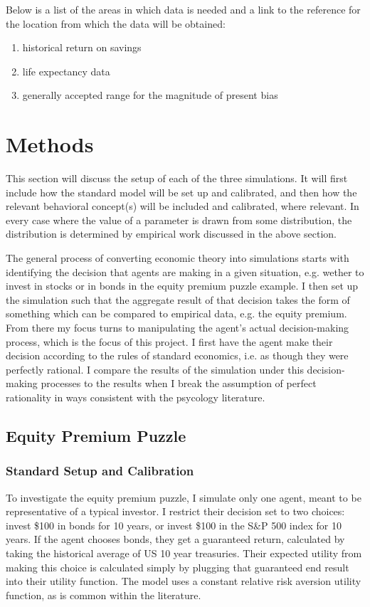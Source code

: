 \documentclass[10pt,twocolumn]{article}
\begin{document}
Below is a list of the areas in which data is needed and a link to the reference for the location from which the data will be obtained:
\begin{enumerate}
    \item historical return on savings\cite{returns}
    \item life expectancy data\cite{death}
    \item generally accepted range for the magnitude of present bias\cite{presentbias}
\end{enumerate}

\section{Methods}
This section will discuss the setup of each of the three simulations. It will first include how the standard model will be set up and calibrated, and then how the relevant behavioral concept(s) will be included and calibrated, where relevant. In every case where the value of a parameter is drawn from some distribution, the distribution is determined by empirical work discussed in the above section.

The general process of converting economic theory into simulations starts with identifying the decision that agents are making in a given situation, e.g. wether to invest in stocks or in bonds in the equity premium puzzle example. I then set up the simulation such that the aggregate result of that decision takes the form of something which can be compared to empirical data, e.g. the equity premium. From there my focus turns to manipulating the agent's actual decision-making process, which is the focus of this project. I first have the agent make their decision according to the rules of standard economics, i.e. as though they were perfectly rational. I compare the results of the simulation under this decision-making processes to the results when I break the assumption of perfect rationality in ways consistent with the psycology literature. 



\subsection{Equity Premium Puzzle}
\subsubsection{Standard Setup and Calibration}
To investigate the equity premium puzzle, I simulate only one agent, meant to be representative of a typical investor. I restrict their decision set to two choices: invest \$100 in bonds for 10 years, or invest \$100 in the S\&P 500 index for 10 years. If the agent chooses bonds, they get a guaranteed return, calculated by taking the historical average of US 10 year treasuries. Their expected utility from making this choice is calculated simply by plugging that guaranteed end result into their utility function. The model uses a constant relative risk aversion utility function, as is common within the literature. 
\end{document}
